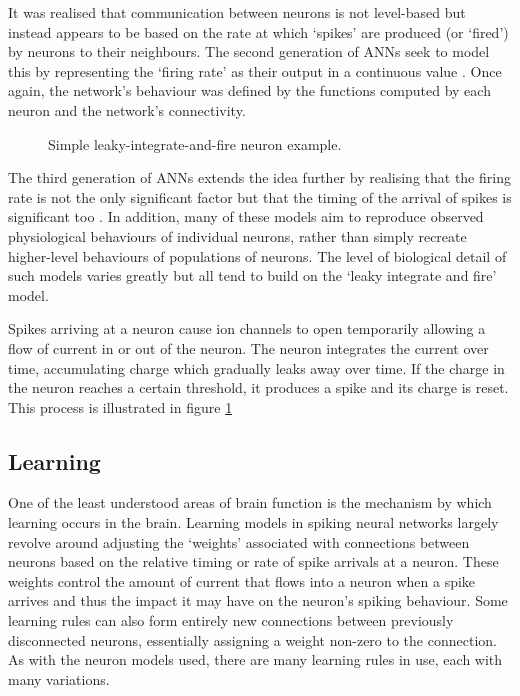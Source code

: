 			It was realised that communication between neurons is not level-based but
			instead appears to be based on the rate at which `spikes' are produced (or
			`fired') by neurons to their neighbours. The second generation of ANNs
			seek to model this by representing the `firing rate' as their output in a
			continuous value \cite{maass97}. Once again, the network's behaviour was
			defined by the functions computed by each neuron and the network's
			connectivity.
			
			\begin{figure}
				\center
				
				\caption{Simple leaky-integrate-and-fire neuron example.}
				\label{fig:snn-example}
			\end{figure}
			
			The third generation of ANNs extends the idea further by realising that
			the firing rate is not the only significant factor but that the timing of
			the arrival of spikes is significant too \cite{maass01}. In addition, many
			of these models aim to reproduce observed physiological behaviours of
			individual neurons, rather than simply recreate higher-level behaviours of
			populations of neurons. The level of biological detail of such models
			varies greatly but all tend to build on the `leaky integrate and fire'
			model.
			
			Spikes arriving at a neuron cause ion channels to open temporarily
			allowing a flow of current in or out of the neuron. The neuron integrates
			the current over time, accumulating charge which gradually leaks away over
			time. If the charge in the neuron reaches a certain threshold, it produces
			a spike and its charge is reset. This process is illustrated in figure
			\ref{fig:snn-example}
		
		
		\subsection{Learning}
			
			One of the least understood areas of brain function is the mechanism by
			which learning occurs in the brain. Learning models in spiking neural
			networks largely revolve around adjusting the `weights' associated with
			connections between neurons based on the relative timing \cite{pfister06}
			or rate \cite{bienenstock82} of spike arrivals at a neuron. These weights
			control the amount of current that flows into a neuron when a spike
			arrives and thus the impact it may have on the neuron's spiking behaviour.
			Some learning rules can also form entirely new connections between
			previously disconnected neurons, essentially assigning a weight non-zero
			to the connection. As with the neuron models used, there are many
			learning rules in use, each with many variations.
			
